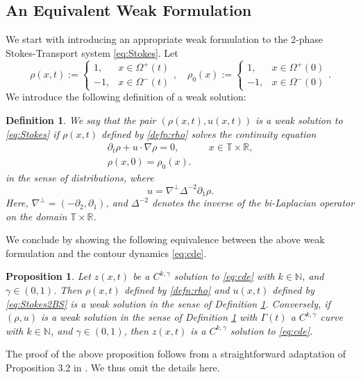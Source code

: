 \documentclass[11pt]{article}
\numberwithin{equation}{section}
\newtheorem{prop}[thm]{Proposition}
\newtheorem{defn}[thm]{Definition}
\newcommand{\R}{\mathbb{R}}
\newcommand{\N}{\mathbb{N}}
\newcommand{\T}{\mathbb{T}}
\newcommand{\p}{\partial}
\begin{document}
\subsection{An Equivalent Weak Formulation}
We start with introducing an appropriate weak formulation to the 2-phase Stokes-Transport system \eqref{eq:Stokes}. Let
\begin{equation}\label{defn:rho}
\rho(x,t) := \begin{cases}
    1, & x \in \Omega^+(t)\\
    -1, & x \in \Omega^-(t)
\end{cases},\quad
\rho_0(x) := \begin{cases}
    1, & x \in \Omega^+(0)\\
    -1, & x \in \Omega^-(0)
\end{cases}.
\end{equation}
We introduce the following definition of a weak solution:
\begin{defn}\label{defn:weak}
    We say that the pair $(\rho(x,t),u(x,t))$ is a weak solution to \eqref{eq:Stokes} if $\rho(x,t)$ defined by \eqref{defn:rho} solves the continuity equation
\begin{equation}
    \label{eq:Stokes2mass}
    \begin{split}
        \p_t \rho + u\cdot \nabla \rho = 0,&\quad x \in \T \times \R,\\
        \rho(x,0) = \rho_0(x).
    \end{split}
\end{equation}
in the sense of distributions, where
\begin{equation}\label{eq:Stokes2BS}
u = \nabla^\perp \Delta^{-2}\p_1 \rho.
\end{equation}
Here, $\nabla^\perp = (-\p_2, \p_1)$, and $\Delta^{-2}$ denotes the inverse of the bi-Laplacian operator on the domain $\T \times \R$. 
\end{defn}
We conclude by showing the following equivalence between the above weak formulation and the contour dynamics \eqref{eq:cde}.
\begin{prop}
    \label{prop:equivalence}
    Let $z(x,t)$ be a $C^{k,\gamma}$ solution to \eqref{eq:cde} with $k \in\N$, and $\gamma \in (0,1)$. Then $\rho(x,t)$ defined by \eqref{defn:rho} and $u(x,t)$ defined by \eqref{eq:Stokes2BS} is a weak solution in the sense of Definition \ref{defn:weak}. Conversely, if $(\rho,u)$ is a weak solution in the sense of Definition \ref{defn:weak} with $\Gamma(t)$ a $C^{k,\gamma}$ curve  with $k\in\N$, and $\gamma \in (0,1)$, then $z(x,t)$ is a $C^{k,\gamma}$ solution to \eqref{eq:cde}.
\end{prop}
The proof of the above proposition follows from a straightforward adaptation of Proposition 3.2 in \cite{cordoba2007contour}. We thus omit the details here.
\end{document}

